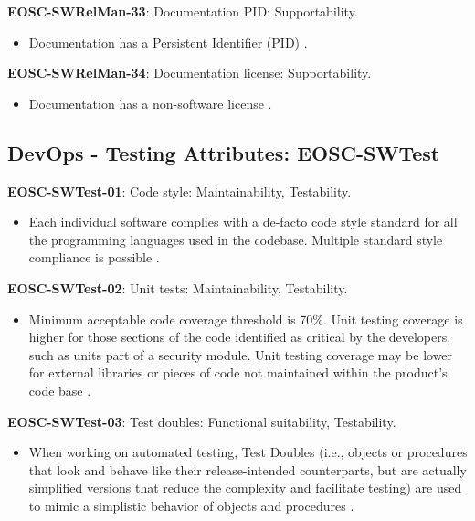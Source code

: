 \textbf{EOSC-SWRelMan-33}: Documentation PID: Supportability.

\begin{itemize}
    \item Documentation has a Persistent Identifier (PID) \cite{orviz_fernandez_eosc-synergy_2020}.
\end{itemize}

\textbf{EOSC-SWRelMan-34}: Documentation license: Supportability.

\begin{itemize}
    \item Documentation has a non-software license \cite{orviz_fernandez_eosc-synergy_2020}.
\end{itemize}

\subsection{DevOps - Testing Attributes: EOSC-SWTest}

\textbf{EOSC-SWTest-01}: Code style: Maintainability, Testability.

\begin{itemize}
    \item Each individual software complies with a de-facto code style standard for all the programming languages used in the codebase. Multiple standard style compliance is possible \cite{orviz_set_2017,raymond_software_2013}.
\end{itemize}

\textbf{EOSC-SWTest-02}: Unit tests: Maintainability, Testability.

\begin{itemize}
    \item Minimum acceptable code coverage threshold is 70\%. Unit testing coverage is higher for those sections of the code identified as critical by the developers, such as units part of a security module. Unit testing coverage may be lower for external libraries or pieces of code not maintained within the product's code base \cite{aberdour_achieving_2007,nagappan_early_2005,boehm_quantitative_1976,shepherdson_cessda_2019,orviz_set_2017,raymond_software_2013}.
\end{itemize}

\textbf{EOSC-SWTest-03}: Test doubles: Functional suitability, Testability.

\begin{itemize}
    \item When working on automated testing,  Test Doubles (i.e., objects or procedures that look and behave like their release-intended counterparts, but are actually simplified versions that reduce the complexity and facilitate testing) are used to mimic a simplistic behavior of objects and procedures \cite{orviz_set_2017,orviz_fernandez_eosc-synergy_2020}.
\end{itemize}

